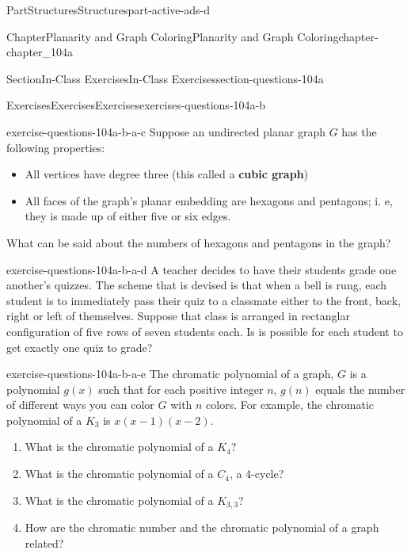 \documentclass[oneside,10pt,]{book}
\newcommand{\terminology}[1]{\textbf{#1}}
\numberwithin{equation}{section}
\begin{document}
\begin{partptx}{Part}{Structures}{}{Structures}{}{}{part-active-ads-d}
\begin{chapterptx}{Chapter}{Planarity and Graph Coloring}{}{Planarity and Graph Coloring}{}{}{chapter-chapter_104a}
\begin{sectionptx}{Section}{In-Class Exercises}{}{In-Class Exercises}{}{}{section-questions-104a}
\begin{exercises-subsection-numberless}{Exercises}{Exercises}{}{Exercises}{}{}{exercises-questions-104a-b}
\begin{exercisegroup}
\begin{divisionexerciseeg}{3}{}{}{exercise-questions-104a-b-a-c}
Suppose an undirected planar graph \(G\) has the following properties:%
\begin{itemize}[label=\textbullet]
\item{}All vertices have degree three (this called a \terminology{cubic graph})%
\item{}All faces of the graph's planar embedding are hexagons and pentagons; i. e, they is made up of either five or six edges.%
\end{itemize}
What can be said about the numbers of hexagons and pentagons in the graph?%
\end{divisionexerciseeg}%
\begin{divisionexerciseeg}{4}{}{}{exercise-questions-104a-b-a-d}%
A teacher decides to have their students grade one another's quizzes.  The scheme that is devised is that when a bell is rung, each  student is to immediately pass their quiz to a classmate either to the front, back, right or left of themselves.  Suppose that class is arranged in rectanglar configuration of five rows of seven students each. Is is possible for each student to get exactly one quiz to grade?%
\end{divisionexerciseeg}%
\begin{divisionexerciseeg}{5}{}{}{exercise-questions-104a-b-a-e}%
%
The chromatic polynomial of a graph, \(G\) is a polynomial \(g(x)\) such that for each positive integer \(n\), \(g(n)\) equals the number of different ways you can color \(G\) with \(n\) colors.  For example, the chromatic polynomial of a \(K_3\) is \(x(x-1)(x-2)\).%
\begin{enumerate}[label=(\alph*)]
\item{}What is the chromatic polynomial of a \(K_4\)?%
\item{}What is the chromatic polynomial of a \(C_4\), a 4-cycle?%
\item{}What is the chromatic polynomial of a \(K_{3,3}\)?%
\item{}How are the chromatic number and the chromatic polynomial of a graph related?%
\end{enumerate}
%
\end{divisionexerciseeg}%
\end{exercisegroup}
\par\medskip\noindent
\end{exercises-subsection-numberless}
\end{sectionptx}
\end{chapterptx}
%
\typeout{************************************************}

\end{partptx}
\end{document}
